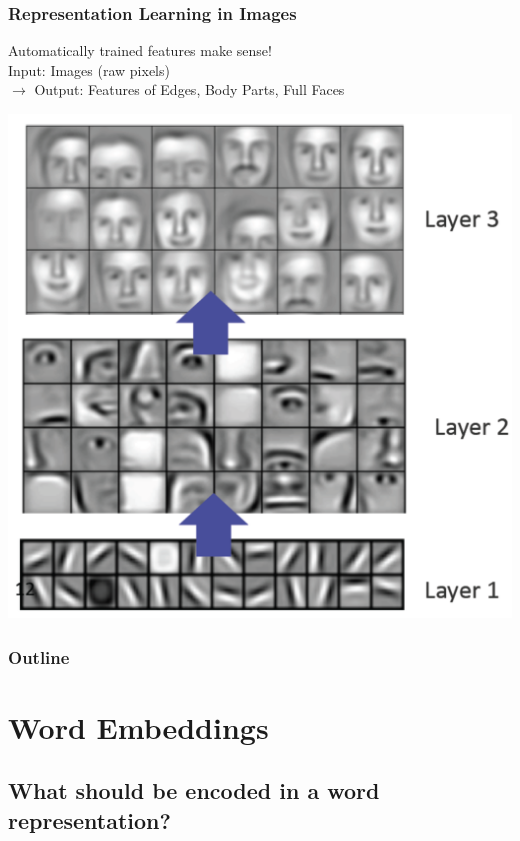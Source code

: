 \documentclass{beamer}
\begin{document}
\begin{frame}
\frametitle{Representation Learning in Images}
Automatically trained features make sense! \cite{lee09convolutional}\\[0.2cm]
Input: Images (raw pixels)\\
$\rightarrow$ Output: Features of Edges, Body Parts, Full Faces

\centerline{\includegraphics[scale=0.35]{figs/lee09example}}
\end{frame}

\begin{frame}
\small{\frametitle{Outline}
\tableofcontents
}
\end{frame}

\section[Word Embedding]{Word Embeddings}

\subsection[What to represent]{What should be encoded in a word representation?}
\end{document}
